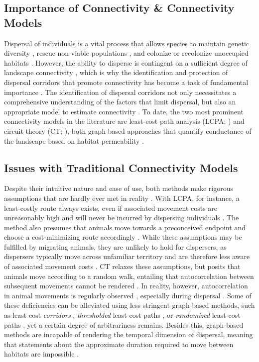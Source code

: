 \documentclass[abstract=on,10pt,a4paper,bibliography=totocnumbered]{article}
\begin{document}
\subsection{Importance of Connectivity \& Connectivity Models}
Dispersal of individuals is a vital process that allows species to maintain
genetic diversity \citep{Perrin.1999, Perrin.2000, Frankham.2002, Leigh.2012,
Baguette.2013}, rescue non-viable populations \citep{Brown.1977}, and colonize
or recolonize unoccupied habitats \citep{Hanski.1999b, MacArthur.2001}. However,
the ability to disperse is contingent on a sufficient degree of landscape
connectivity \citep{Fahrig.2003, Clobert.2012}, which is why the identification
and protection of dispersal corridors that promote connectivity has become a
task of fundamental importance \citep{Nathan.2008, Doerr.2011, Rudnick.2012}.
The identification of dispersal corridors not only necessitates a comprehensive
understanding of the factors that limit dispersal, but also an appropriate model
to estimate connectivity \citep{Baguette.2013, Vasudev.2015, Hofmann.2021}. To
date, the two most prominent connectivity models in the literature are
least-cost path analysis (LCPA; \citealp{Adriaensen.2003}) and circuit theory
(CT; \citealp{McRae.2006, McRae.2008}), both graph-based approaches that
quantify conductance of the landscape based on habitat permeability
\citep{Zeller.2012}.

\subsection{Issues with Traditional Connectivity Models}
Despite their intuitive nature and ease of use, both methods make rigorous
assumptions that are hardly ever met in reality \citep{Diniz.2019}. With LCPA,
for instance, a least-costly route always exists, even if associated movement
costs are unreasonably high and will never be incurred by dispersing individuals
\citep{Sawyer.2011}. The method also presumes that animals move towards a
preconceived endpoint and choose a cost-minimizing route accordingly
\citep{Abrahms.2017}. While these assumptions may be fulfilled by migrating
animals, they are unlikely to hold for dispersers, as dispersers typically move
across unfamiliar territory and are therefore less aware of associated movement
costs \citep{Koen.2014, Cozzi.2020}. CT relaxes these assumptions, but posits
that animals move according to a random walk, entailing that autocorrelation
between subsequent movements cannot be rendered \citep{Diniz.2019}. In reality,
however, autocorrelation in animal movements is regularly observed
\citep{Bovet.1991, Schultz.2001}, especially during dispersal \citep{Cozzi.2020,
Hofmann.2021}. Some of these deficiencies can be alleviated using less stringent
graph-based methods, such as least-cost \textit{corridors} \citep{Pinto.2009},
\textit{thresholded} least-cost paths \citep{Landguth.2012}, or
\textit{randomized} least-cost paths \citep{Panzacchi.2016}, yet a certain
degree of arbitrariness remains. Besides this, graph-based methods are incapable
of rendering the temporal dimension of dispersal, meaning that statements about
the approximate duration required to move between habitats are impossible
\citep{Martensen.2017, Diniz.2019}.
\end{document}

